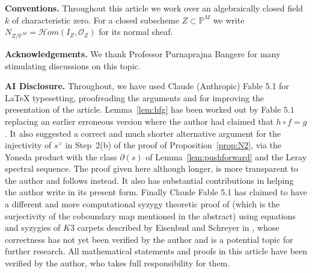 \documentclass[11pt,twoside]{amsart}
\theoremstyle{plain}
\newtheorem{theorem}{Theorem}[section]
\theoremstyle{definition}
\newcommand{\PP}{\mathbb{P}}
\newcommand{\OO}{\mathcal{O}}
\newcommand{\Yt}{\widetilde{Y}}
\newcommand{\Ct}{\widetilde{C}}
\begin{document}



\medskip

\noindent\textbf{Conventions.} Throughout this article we work over an algebraically closed field $k$ of characteristic zero. For a closed subscheme $Z \subset \mathbb{P}^M$ we write $N_{Z/\mathbb{P}^M} = \mathcal{H}om(I_Z,\mathcal{O}_Z)$ for its normal sheaf.

\vspace{0.2cm}

\noindent\textbf{Acknowledgements.} We thank Professor Purnaprajna Bangere for many stimulating discussions on this topic. %

\noindent\textbf{AI Disclosure.} Throughout, we have used Claude (Anthropic) Fable 5.1 for LaTeX typesetting, proofreading the arguments and for improving the presentation of the article. Lemma~\ref{lem:hfg} has been worked out by Fable $5.1$ replacing an earlier erroneous version where the author had claimed that $h \circ f = g$. It also suggested a correct and much shorter alternative argument for the injectivity of $s^{\vee}$ in Step~2(b) of the proof of Proposition~\ref{prop:N2}, via the Yoneda product with the class $\partial(s)$ of Lemma~\ref{lem:pushforward} and the Leray spectral sequence. The proof given here although longer, is more transparent to the author and follows \cite{BM25} instead. It also has substantial contributions in helping the author write  in its present form. Finally Claude Fable 5.1 has claimed to have a different and  more computational syzygy theoretic proof of (which is the surjectivity of the coboundary map mentioned in the abstract) using equations and syzygies of $K3$ carpets described by Eisenbud and Schreyer in \cite{ES18}, whose correctness has not yet been verified by the author and is a potential topic for further research. All mathematical statements and proofs in this article have been verified by the author, who takes full responsibility for them. 
\end{document}
